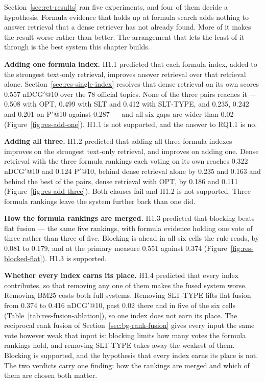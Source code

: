Section~\ref{sec:ret-results} ran five experiments, and four of them decide a hypothesis. Formula
evidence that holds up at formula search adds nothing to answer retrieval that a dense retriever
has not already found. More of it makes the result worse rather than better. The arrangement that
lets the least of it through is the best system this chapter builds.

\textbf{Adding one formula index.} H1.1 predicted that each formula index, added to the strongest
text-only retrieval, improves answer retrieval over that retrieval alone.
Section~\ref{sec:res-single-index} resolves that dense retrieval on its own scores 0.557
nDCG$'$@10 over the 78 official topics. None of the three pairs reaches it --- 0.508 with OPT, 0.499
with SLT and 0.412 with SLT-TYPE, and 0.235, 0.242 and 0.201 on P$'$@10 against 0.287 --- and all
six gaps are wider than 0.02 (Figure~\ref{fig:res-add-one}). H1.1 is not supported, and the answer
to RQ1.1 is no.

\textbf{Adding all three.} H1.2 predicted that adding all three formula indexes improves on the
strongest text-only retrieval, and improves on adding one. Dense retrieval with the three formula
rankings each voting on its own reaches 0.322 nDCG$'$@10 and 0.124 P$'$@10, behind dense retrieval
alone by 0.235 and 0.163 and behind the best of the pairs, dense retrieval with OPT, by 0.186 and
0.111 (Figure~\ref{fig:res-add-three}). Both clauses fail and H1.2 is not supported. Three formula
rankings leave the system further back than one did.

\textbf{How the formula rankings are merged.} H1.3 predicted that blocking beats flat fusion --- the
same five rankings, with formula evidence holding one vote of three rather than three of five.
Blocking is ahead in all six cells the rule reads, by 0.081 to 0.179, and at the primary measure
0.551 against 0.374 (Figure~\ref{fig:res-blocked-flat}). H1.3 is supported.

\textbf{Whether every index earns its place.} H1.4 predicted that every index contributes, so that
removing any one of them makes the fused system worse. Removing BM25 costs both full systems.
Removing SLT-TYPE lifts flat fusion from 0.374 to 0.416 nDCG$'$@10, past 0.02 there and in five of
the six cells (Table~\ref{tab:res-fusion-ablation}), so one index does not earn its place. The
reciprocal rank fusion of Section~\ref{sec:bg-rank-fusion} gives every input the same vote however
weak that input is: blocking limits how many votes the formula rankings hold, and removing SLT-TYPE
takes away the weakest of them. Blocking is supported, and the hypothesis that every index earns
its place is not. The two verdicts carry one finding: how the rankings are merged and which of them
are chosen both matter.

